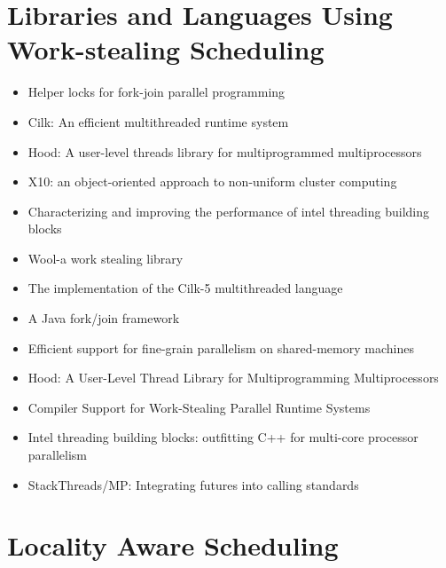 \section{Libraries and Languages Using Work-stealing Scheduling}
\label{sec:lr-libaries-and-languages-using-work-stealing-scheduling}

\begin{itemize}
\item Helper locks for fork-join parallel programming
  \cite{Agrawal2010}
\item Cilk: An efficient multithreaded runtime system
  \cite{Blumofe1995}
\item Hood: A user-level threads library for multiprogrammed
  multiprocessors \cite{Blumofe1998}
\item X10: an object-oriented approach to non-uniform cluster
  computing \cite{Charles2005}
\item Characterizing and improving the performance of intel threading
  building blocks \cite{Contreras2008}
\item Wool-a work stealing library \cite{Faxen2009}
\item The implementation of the Cilk-5 multithreaded language
  \cite{Frigo1998}
\item A Java fork/join framework \cite{Lea2000}
\item Efficient support for fine-grain parallelism on shared-memory
  machines \cite{Lowenthal1998}
\item Hood: A User-Level Thread Library for Multiprogramming
  Multiprocessors \cite{Papadopoulos1998}
\item Compiler Support for Work-Stealing Parallel Runtime Systems
  \cite{Raman2009}
\item Intel threading building blocks: outfitting C++ for multi-core
  processor parallelism \cite{Reinders2007}
\item StackThreads/MP: Integrating futures into calling standards
  \cite{Taura1999}
\end{itemize}


\section{Locality Aware Scheduling}
\label{sec:lr-locality-aware-scheduling}

